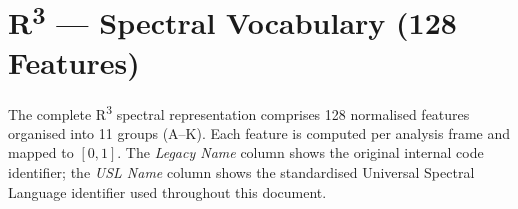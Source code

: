 
\section{R\textsuperscript{3} --- Spectral Vocabulary (128 Features)}
\label{sec:r3-tables}

The complete R\textsuperscript{3} spectral representation comprises 128 normalised
features organised into 11 groups (A--K). Each feature is computed per analysis
frame and mapped to $[0,1]$. The \emph{Legacy Name} column shows the original
internal code identifier; the \emph{USL Name} column shows the standardised
Universal Spectral Language identifier used throughout this document.


